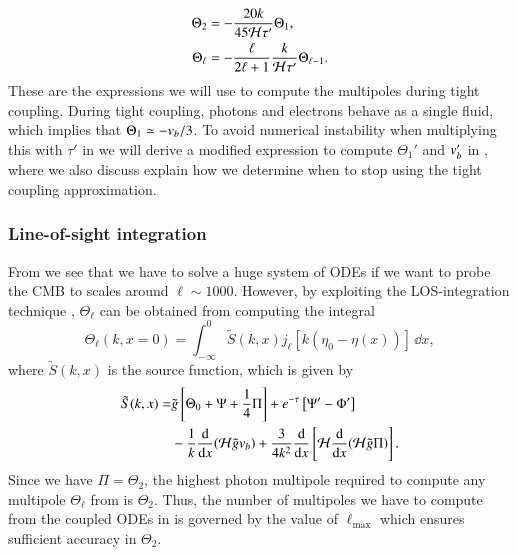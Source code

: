\begin{subequations} \label{eq:M3:theory:IC_Thetas}
    \begin{align}
        \Theta_2 &= - \frac{20k}{45\mathcal{H}\tau'}\Theta_1, \label{eq:M3:theory:IC_Theta2} \\
        \Theta_\ell &= - \frac{\ell}{2\ell+1} \frac{k}{\mathcal{H}\tau'}\Theta_{\ell-1} \label{eq:M3:theory:IC_Theta_ell}. 
    \end{align}
\end{subequations}
These are the expressions we will use to compute the multipoles during tight coupling. During tight coupling, photons and electrons behave as a single fluid, which implies that $\Theta_1\simeq-v_b/3$. To avoid numerical instability when multiplying this with $\tau'$ in  we will derive a modified expression to compute $\Theta_1'$ and $v_b'$ in , where we also discuss explain how we determine when to stop using the tight coupling approximation.  


\subsubsection{Line-of-sight integration}\label{sssec:M3:theory:line_of_sight_integration}
From  we see that we have to solve a huge system of ODEs if we want to probe the CMB to scales around $\ell\sim1000$. However, by exploiting the LOS-integration technique , $\Theta_\ell$ can be obtained from computing the integral 
\begin{equation} \label{eq:M3:theory:Theta_ell_LOS_integration}
    \Theta_\ell(k,x=0) = \int_{-\infty}^0 \tilde{S}(k,x) j_\ell [k(\eta_0 - \eta(x))]\,\dd x, 
\end{equation}
where $\tilde{S}(k,x)$ is the source function, which is given by 
\begin{equation} \label{eq:M3:theory:source_function_LOS}
    \begin{split}
        \tilde{S}(k,x) =& \tilde{g} \left[ \Theta_0 + \Psi + \frac{1}{4} \Pi \right] + e^{-\tau}\left[ \Psi' - \Phi' \right] \\
        & - \frac{1}{k}\dv{x}(\mathcal{H} \tilde{g} v_b) + \frac{3}{4k^2}\dv{x}\left[ \mathcal{H} \dv{x}(\mathcal{H}\tilde{g}\Pi) \right].
    \end{split}
\end{equation}
Since we have $\Pi=\Theta_2$, the highest photon multipole required to compute any multipole $\Theta_\ell$ from  is $\Theta_2$. Thus, the number of multipoles we have to compute from the coupled ODEs in  is governed by the value of $\ell_\mathrm{max}$ which ensures sufficient accuracy in $\Theta_2$. 
